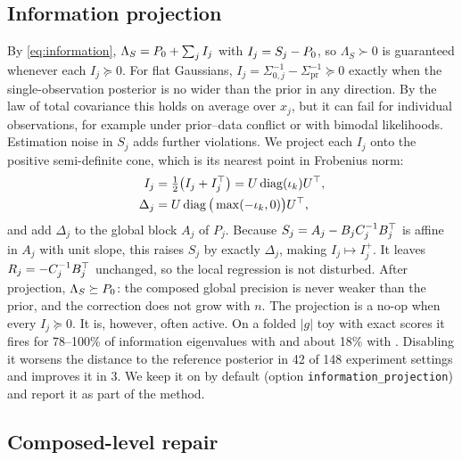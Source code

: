 \subsection{Information projection}\label{sec:impl-projection}

By \cref{eq:information}, $\Lambda_S=P_{0}+\sum_jI_j$ with $I_j=S_j-P_{0}$, so $\Lambda_S\succ0$ is guaranteed whenever each $I_j\succeq0$.
For flat Gaussians, $I_j=\Sigma_{0,j}^{-1}-\Sigma_\mathrm{pr}^{-1}\succeq0$ exactly when the single-observation posterior is no wider than the prior in any direction.
By the law of total covariance this holds on average over $x_j$, but it can fail for individual observations, for example under prior--data conflict or with bimodal likelihoods.
Estimation noise in $S_j$ adds further violations.
We project each $I_j$ onto the positive semi-definite cone, which is its nearest point in Frobenius norm:
\begin{equation}\label{eq:projection}
\begin{aligned}
  I_j&=\tfrac12\big(I_j+I_j^\top\big)=U\operatorname{diag}(\iota_k)U^\top,\\
  \Delta_j&=U\operatorname{diag}\big(\max(-\iota_k,0)\big)U^\top,
\end{aligned}
\end{equation}
and add $\Delta_j$ to the global block $A_j$ of $P_j$.
Because $S_j=A_j-B_jC_j^{-1}B_j^\top$ is affine in $A_j$ with unit slope, this raises $S_j$ by exactly $\Delta_j$, making $I_j\mapsto I_j^+$.
It leaves $R_j=-C_j^{-1}B_j^\top$ unchanged, so the local regression is not disturbed.
After projection, $\Lambda_S\succeq P_{0}$: the composed global precision is never weaker than the prior, and the correction does not grow with $n$.
The projection is a no-op when every $I_j\succeq0$.
It is, however, often active.
On a folded $|g|$ toy with exact scores it fires for 78--100\% of information eigenvalues with \arrowm{} and about 18\% with \quiver.
Disabling it worsens the distance to the reference posterior in 42 of 148 experiment settings and improves it in 3.
We keep it on by default (option \texttt{information\_projection}) and report it as part of the method.

\subsection{Composed-level repair}\label{sec:impl-repair}

